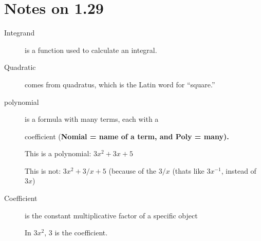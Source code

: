

\section{Notes on 1.29}

\begin{description}

\item[Integrand] is a function used to calculate an integral.

\item[Quadratic] comes from quadratus, which is the Latin word for ``square.''

\item[polynomial] is a formula with many terms, each with a

                  coefficient (\bf Nomial \rm = name of a term, and
                  \bf Poly \rm = many).


                  This is a polynomial: $3x^2 + 3x + 5$

                  This is not: $3x^2 + 3/x + 5$ (because of the $3/x$
                  (thats like $3x^{-1}$, instead of $3x$)



\item[Coefficient] is the constant multiplicative factor of a specific
object

        In $3x^2$, 3 is the coefficient.

\end{description}





